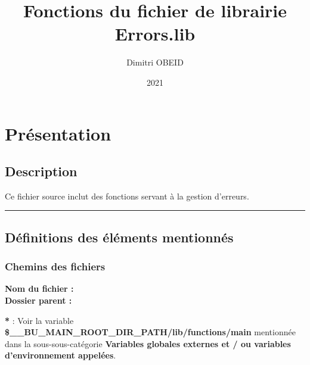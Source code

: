 \documentclass[a4paper,10pt]{article}
\title{\color{sec1}Fonctions du fichier de librairie \color{path}Errors.lib}\color{text}
\author{Dimitri OBEID}
\date{2021}
\begin{document}
    \maketitle
    \tableofcontents
    \newpage

    \color{sec1}
    \section{Présentation}\color{text}

    \color{sec2}
    \subsection{Description}\color{text}

    \begin{justify}
        Ce fichier source inclut des fonctions servant à la gestion d'erreurs.
    \end{justify}




    \color{sec2}\par\noindent\rule{\textwidth}{0.4pt}\color{text}

    \color{sec2}
    \subsection{Définitions des éléments mentionnés}\color{text}

    \color{sec3}
    \subsubsection{Chemins des fichiers}\color{text}

    \textbf{Nom du fichier : \color{path}}\\[1\baselineskip]

    \textbf{Dossier parent : \color{path}}\\[1\baselineskip]

    \begin{justify}
        \textbf{*} : Voir la variable \textbf{\color{vars}\$\_\_BU\_MAIN\_ROOT\_DIR\_PATH\color{path}/lib/functions/main} mentionnée dans la sous-sous-catégorie \textbf{\color{sec3}Variables globales externes et / ou variables d'environnement appelées}.
    \end{justify}
\end{document}
